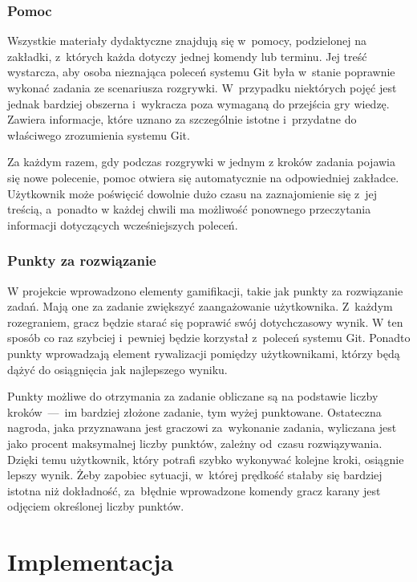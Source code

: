 \documentclass[12pt,a4paper,polish,thesis]{dcsbook}
\begin{document}
{	\subsection{Pomoc}
	
	Wszystkie materiały dydaktyczne znajdują się w~pomocy, podzielonej na zakładki, z~których każda dotyczy jednej komendy lub terminu. Jej treść wystarcza, aby osoba nieznająca poleceń systemu Git była w~stanie poprawnie wykonać zadania ze scenariusza rozgrywki. W~przypadku niektórych pojęć jest jednak bardziej obszerna i~wykracza poza wymaganą do przejścia gry wiedzę. Zawiera informacje, które uznano za szczególnie istotne i~przydatne do właściwego zrozumienia systemu Git.
	
	Za każdym razem, gdy podczas rozgrywki w jednym z kroków zadania pojawia się nowe polecenie, pomoc otwiera się automatycznie na odpowiedniej zakładce. Użytkownik może poświęcić dowolnie dużo czasu na zaznajomienie się z~jej treścią, a~ponadto w każdej chwili ma możliwość ponownego przeczytania informacji dotyczących wcześniejszych poleceń.  
	
	\subsection{Punkty za rozwiązanie}

	W projekcie wprowadzono elementy gamifikacji, takie jak punkty za rozwiązanie zadań. Mają one za zadanie zwiększyć zaangażowanie użytkownika. Z~każdym rozegraniem, gracz będzie starać się poprawić swój dotychczasowy wynik. W ten sposób co raz szybciej i~pewniej będzie korzystał z~poleceń systemu Git. Ponadto punkty wprowadzają element rywalizacji pomiędzy użytkownikami, którzy będą dążyć do osiągnięcia jak najlepszego wyniku.

	Punkty możliwe do otrzymania za zadanie obliczane są na podstawie liczby kroków~---~im bardziej złożone zadanie, tym wyżej punktowane. Ostateczna nagroda, jaka przyznawana jest graczowi za~wykonanie zadania, wyliczana jest jako procent maksymalnej liczby punktów, zależny od~czasu rozwiązywania. Dzięki temu użytkownik, który potrafi szybko wykonywać kolejne kroki, osiągnie lepszy wynik. Żeby zapobiec sytuacji, w~której prędkość stałaby się bardziej istotna niż dokładność, za~błędnie wprowadzone komendy gracz karany jest odjęciem określonej liczby punktów.
	
	\chapter{Implementacja} \label{Implementacja}

}
\end{document}
